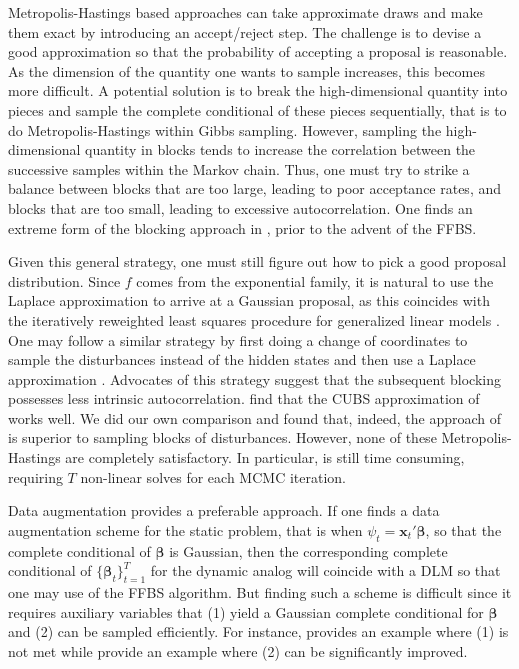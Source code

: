 \documentclass[12pt]{article}
\newcommand{\bbeta}{\boldsymbol{\beta}}
\newcommand{\vx}{\boldsymbol{x}}
\newcounter{parnum}
\newcommand{\npoint}{%
  \noindent\refstepcounter{parnum}%
  \makebox[0.5in][c]{\textbf{\arabic{parnum}.}} %
  \marginnote{\small\ttfamily\the\inputlineno}}
\renewcommand{\npoint}{}
\begin{document}
\npoint Metropolis-Hastings based approaches can take approximate draws and make
them exact by introducing an accept/reject step.  The challenge is to devise a
good approximation so that the probability of accepting a proposal is
reasonable.  As the dimension of the quantity one wants to sample increases,
this becomes more difficult.  A potential solution is to break the
high-dimensional quantity into pieces and sample the complete conditional of
these pieces sequentially, that is to do Metropolis-Hastings within Gibbs
sampling.  However, sampling the high-dimensional quantity in blocks tends to
increase the correlation between the successive samples within the Markov chain.
Thus, one must try to strike a balance between blocks that are too large,
leading to poor acceptance rates, and blocks that are too small, leading to
excessive autocorrelation.  One finds an extreme form of the blocking approach
in \cite{carlin-etal-1992}, prior to the advent of the FFBS.

\npoint Given this general strategy, one must still figure out how to pick a
good proposal distribution.  Since $f$ comes from the exponential family, it is
natural to use the Laplace approximation to arrive at a Gaussian proposal, as
this coincides with the iteratively reweighted least squares procedure for
generalized linear models \citep{gamerman-1997}.  One may follow a similar
strategy by first doing a change of coordinates to sample the disturbances
instead of the hidden states and then use a Laplace approximation
\citep{gamerman-1998, shephard-pitt-1997}.  Advocates of this strategy suggest
that the subsequent blocking possesses less intrinsic autocorrelation.
\cite{migon-etal-2013} find that the CUBS approximation of \cite{west-etal-1985}
works well.  We did our own comparison and found that, indeed, the approach of
\cite{migon-etal-2013} is superior to sampling blocks of disturbances.  However,
none of these Metropolis-Hastings are completely satisfactory.  In particular,
\cite{migon-etal-2013} is still time consuming, requiring $T$ non-linear solves
for each MCMC iteration.

\npoint Data augmentation provides a preferable approach.  If one finds a data
augmentation scheme for the static problem, that is when $\psi_t = \vx_t'
\bbeta$, so that the complete conditional of $\bbeta$ is Gaussian, then the
corresponding complete conditional of $\{\bbeta_t\}_{t=1}^T$ for the dynamic
analog will coincide with a DLM so that one may use of the FFBS algorithm.
\npoint But finding such a scheme is difficult since it requires auxiliary
variables that (1) yield a Gaussian complete conditional for $\bbeta$ and (2)
can be sampled efficiently.  For instance, \cite{mcfadden-1974} provides an
example where (1) is not met while \cite{holmes-held-2006} provide an example
where (2) can be significantly improved.
\end{document}
